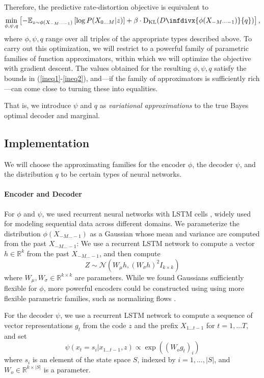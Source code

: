 \documentclass[11pt,letterpaper]{article}
\newcommand{\infdiv}{D\infdivx}
\begin{document}
Therefore, the predictive rate-distortion objective is equivalent to
\begin{equation}\label{eq:bound}
	\min_{\phi, \psi, q}	\left[-	\mathbb{E}_{z \sim \phi(X_{-M\dots-1})}\left[\log P(X_{0\dots M} | z)\right] + \beta \cdot \operatorname{D_{KL}}(\infdiv{\phi(X_{-M\dots-1})}{q})\right],
\end{equation}
where $\phi, \psi, q$ range over all triples of the appropriate types described above.
To carry out this optimization, we will restrict to a powerful family of parametric families of function approximators, within which we will optimize the objective with gradient descent.
The values obtained for the resulting $\phi, \psi, q$ satisfy the bounds in (\ref{ineq1}-\ref{ineq2}), and---if the family of approximators is sufficiently rich---can come close to turning these into equalities.

That is, we introduce $\psi$ and $q$ as \emph{variational approximations} \citep{blei-variational-2016} to the true Bayes optimal decoder and marginal. 


\subsection{Implementation}
We will choose the approximating families for the encoder $\phi$, the decoder $\psi$, and the distribution $q$ to be certain types of neural networks.
\paragraph{Encoder and Decoder}
For $\phi$ and $\psi$, we used recurrent neural networks with LSTM cells \citep{hochreiter-long-1997}, widely used for modeling sequential data across different domains.
We parameterize the distribution $\phi(X_{-M\dots-1})$ as a Gaussian whose mean and variance are computed from the past $X_{-M\dots-1}$:
We use a recurrent LSTM network to compute a vector $h \in \mathbb{R}^k$ from the past $X_{-M\dots-1}$, and then compute
\begin{equation}
	Z \sim \mathcal{N}(W_\mu h, (W_\sigma h)^2 I_{k\times k})
\end{equation}
where $W_\mu, W_\sigma \in \mathbb{R}^{k\times k}$ are parameters.
While we found Gaussians sufficiently flexible for $\phi$, more powerful encoders could be constructed using using more flexible parametric families, such as normalizing flows \citep{rezende-variational-2015, kingma-improving-2016}.

For the decoder $\psi$, we use a recurrent LSTM network to compute a sequence of vector representations $g_t$ from the code $z$ and the prefix $X_{1\dots t-1}$ for $t = 1, \dots T$, and set
\begin{equation}
	\psi(x_t = s_i|x_{1...t-1}, z) \propto \exp((W_o g_t)_i)
\end{equation}
where $s_i$ is an element of the state space $S$, indexed by $i=1, ..., |S|$, and $W_o \in \mathbb{R}^{k \times |S|}$ is a parameter.
\end{document}
